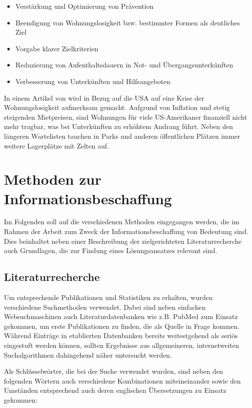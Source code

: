 \begin{itemize}
	\item Verstärkung und Optimierung von Prävention
	\item Beendigung von Wohnungslosigkeit bzw. bestimmter Formen als deutliches Ziel
	\item Vorgabe klarer Zielkriterien
	\item Reduzierung von Aufenthaltsdauern in Not- und Übergangsunterkünften
	\item Verbesserung von Unterkünften und Hilfsangeboten
\end{itemize}

In einem Artikel von \citet{Lopez.2022} wird in Bezug auf die USA auf eine Krise der Wohnungslosigkeit aufmerksam gemacht. Aufgrund von Inflation und stetig steigenden Mietpreisen, sind Wohnungen für viele US-Amerikaner finanziell nicht mehr tragbar, was bei Unterkünften zu erhöhtem Andrang führt. Neben den längeren Wartelisten tauchen in Parks und anderen öffentlichen Plätzen immer weitere Lagerplätze mit Zelten auf.


\section{Methoden zur Informationsbeschaffung}

Im Folgenden soll auf die verschiedenen Methoden eingegangen werden, die im Rahmen der Arbeit zum Zweck der Informationsbeschaffung von Bedeutung sind. Dies beinhaltet neben einer Beschreibung der zielgerichteten Literaturrecherche auch Grundlagen, die zur Findung eines Lösungsansatzes relevant sind.

\subsection{Literaturrecherche}

Um entsprechende Publikationen und Statistiken zu erhalten, wurden verschiedene Suchmethoden verwendet. Dabei sind neben einfachen Websuchmaschinen auch Literaturdatenbanken wie z.B. PubMed zum Einsatz gekommen, um erste Publikationen zu finden, die als Quelle in Frage kommen. Während Einträge in etablierten Datenbanken bereits weitestgehend als seriös eingestuft werden können, sollten Ergebnisse aus allgemeineren, internetweiten Suchalgorithmen dahingehend näher untersucht werden.

Als Schlüsselwörter, die bei der Suche verwendet wurden, sind neben den folgenden Wörtern auch verschiedene Kombinationen miteineinander sowie den Umständen entsprechend auch deren englischen Übersetzungen zu Einsatz gekommen:

